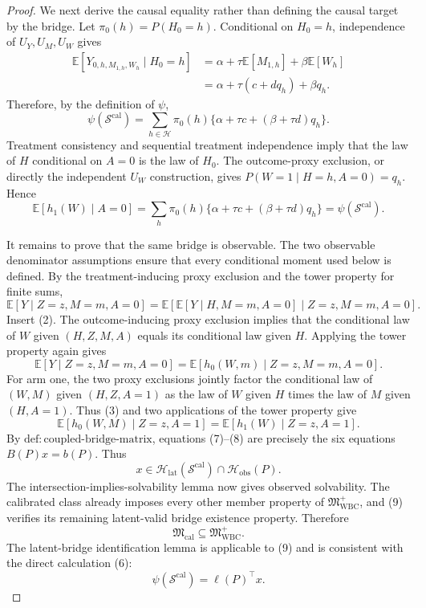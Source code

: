 \documentclass{article}
\begin{document}
\begin{proof}
We next derive the causal equality rather than defining the causal target by the
bridge.  Let \(\pi_0(h)=P(H_0=h)\).  Conditional on \(H_0=h\), independence of
\(U_Y,U_M,U_W\) gives
\[
 \begin{aligned}
 \mathbb E[Y_{0,h,M_{1,h},W_h}\mid H_0=h]
 &=\alpha+\tau\mathbb E[M_{1,h}]+\beta\mathbb E[W_h]\\
 &=\alpha+\tau(c+dq_h)+\beta q_h.
 \end{aligned}
 \tag{4}
\]
Therefore, by the definition of \(\psi\),
\[
 \psi(\mathcal S^{\mathrm{cal}})
 =\sum_{h\in\mathcal H}\pi_0(h)
   \{\alpha+\tau c+(\beta+\tau d)q_h\}.
 \tag{5}
\]
Treatment consistency and sequential treatment independence imply that the law of
\(H\) conditional on \(A=0\) is the law of \(H_0\).  The outcome-proxy exclusion,
or directly the independent \(U_W\) construction, gives
\(P(W=1\mid H=h,A=0)=q_h\).  Hence
\[
 \mathbb E[h_1(W)\mid A=0]
 =\sum_h\pi_0(h)\{\alpha+\tau c+(\beta+\tau d)q_h\}
 =\psi(\mathcal S^{\mathrm{cal}}).
 \tag{6}
\]

It remains to prove that the same bridge is observable.  The two observable
denominator assumptions ensure that every conditional moment used below is defined.
By the treatment-inducing proxy exclusion and the tower property for finite sums,
\[
 \mathbb E[Y\mid Z=z,M=m,A=0]
 =\mathbb E\!\left[\mathbb E[Y\mid H,M=m,A=0]
                    \mid Z=z,M=m,A=0\right].
\]
Insert (2).  The outcome-inducing proxy exclusion implies that the conditional law
of \(W\) given \((H,Z,M,A)\) equals its conditional law given \(H\).  Applying the
tower property again gives
\[
 \mathbb E[Y\mid Z=z,M=m,A=0]
 =\mathbb E[h_0(W,m)\mid Z=z,M=m,A=0].
 \tag{7}
\]
For arm one, the two proxy exclusions jointly factor the conditional law of
\((W,M)\) given \((H,Z,A=1)\) as the law of \(W\) given \(H\) times the law of
\(M\) given \((H,A=1)\).  Thus (3) and two applications of the tower property give
\[
 \mathbb E[h_0(W,M)\mid Z=z,A=1]
 =\mathbb E[h_1(W)\mid Z=z,A=1].
 \tag{8}
\]
By \(\mathrm{def{:}coupled\text{-}bridge\text{-}matrix}\), equations (7)--(8) are
precisely the six equations \(B(P)x=b(P)\).  Thus
\[
 x\in\mathcal H_{\mathrm{lat}}(\mathcal S^{\mathrm{cal}})
       \cap\mathcal H_{\mathrm{obs}}(P).
 \tag{9}
\]
The intersection-implies-solvability lemma now gives observed solvability.  The
calibrated class already imposes every other member property of
\(\mathfrak M_{\mathrm{WBC}}^+\), and (9) verifies its remaining latent-valid bridge
existence property.  Therefore
\[
 \mathfrak M_{\mathrm{cal}}\subseteq\mathfrak M_{\mathrm{WBC}}^+.
 \tag{10}
\]
The latent-bridge identification lemma is applicable to (9) and is consistent with
the direct calculation (6):
\[
 \psi(\mathcal S^{\mathrm{cal}})=\ell(P)^\top x.
 \tag{11}
\]


\end{proof}
\end{document}
